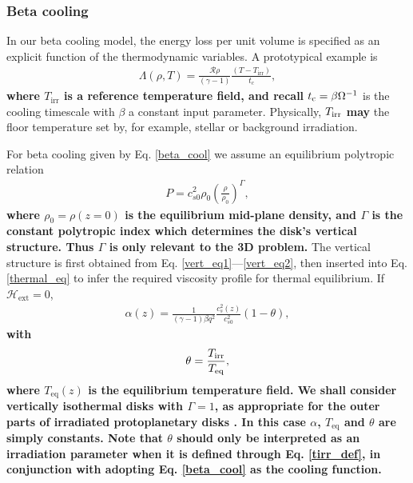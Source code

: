 \subsubsection{Beta cooling}\label{beta_cool_model}
In our beta cooling model, the energy loss per unit volume is specified  
as an explicit function of the thermodynamic variables. 
A prototypical example is 
\begin{align}\label{beta_cool}
  \Lambda(\rho, T) =
  \frac{\mathcal{R}\rho}{(\gamma-1)}\frac{\left(T-T_\mathrm{irr}\right)}{t_c},
\end{align}
{\bf where $T_\mathrm{irr}$ is a reference temperature field, and
recall}  $t_\mathrm{c} = \beta\Omega^{-1}$ is 
the cooling timescale with $\beta$ a constant input parameter.
Physically, $T_\mathrm{irr}$ {\bf may} the floor temperature set by, 
for example, stellar or background irradiation. 


For beta cooling given by Eq. \ref{beta_cool} we assume an 
equilibrium polytropic relation 
\begin{align}\label{poly_vert} 
  P  =
c_{s0}^2\rho_0\left(\frac{\rho}{\rho_0}\right)^\Gamma,
\end{align}
{\bf where $\rho_0 = \rho(z=0)$ is the equilibrium mid-plane density, and    
$\Gamma$ is the constant polytropic index which determines the disk's
  vertical structure. Thus $\Gamma$ is only relevant to the 3D
  problem.}     
The vertical structure is first obtained from 
Eq. \ref{vert_eq1}---\ref{vert_eq2}, %
then inserted into 
Eq. \ref{thermal_eq} to infer the required viscosity profile for
thermal equilibrium. If  $\mathcal{H}_\mathrm{ext}=0$, 
\begin{align}\label{alpha_beta_relation}
\alpha(z) = \frac{1}{(\gamma-1)\beta
   q^2}\frac{c_s^2(z)}{c_{s0}^2}\left(1 - \theta\right),
\end{align} 
{\bf with 
  \begin{align}\label{tirr_def}
    \theta = \frac{T_\mathrm{irr}}{T_\mathrm{eq}},
  \end{align}
   where $T_\mathrm{eq}(z)$ is the equilibrium temperature field.
   We shall consider vertically isothermal disks with $\Gamma=1$, as
  appropriate for the outer parts of irradiated protoplanetary disks
   \citep{chiang97}. In this case  
   $\alpha$, $T_\mathrm{eq}$ and $\theta$ are simply constants. 
    Note that $\theta$  
    should only be interpreted as an irradiation parameter when it is 
    defined through Eq. \ref{tirr_def}, in conjunction with adopting  
    Eq. \ref{beta_cool} as the cooling function. 
 } 

